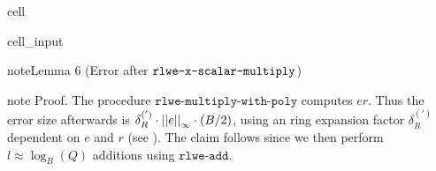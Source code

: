 \documentclass[letterpaper,10pt,english]{jupyterBook}
\begin{document}
\begin{sphinxuseclass}{cell}\begin{sphinxVerbatimInput}

\begin{sphinxuseclass}{cell_input}
\begin{sphinxVerbatim}[commandchars=\\\{\}]
    
       
       
      \PYG{p}{[}      \PYG{p}{]}
       
          \PYG{p}{[}\PYG{p}{]} \PYG{p}{[}\PYG{p}{]} 
            
     
\end{sphinxVerbatim}

\end{sphinxuseclass}\end{sphinxVerbatimInput}

\end{sphinxuseclass}\label{Thesis:error-after-rlwe-x-scalar-multiply}
\begin{sphinxadmonition}{note}{Lemma 6 (Error after \protect\(\texttt{rlwe-x-scalar-multiply}\protect\))}
\end{sphinxadmonition}

\begin{sphinxadmonition}{note}
\sphinxAtStartPar
Proof. The procedure \(\texttt{rlwe-multiply-with-poly}\) computes \(er\).
Thus the error size afterwards is \(\delta_R^{(')} \cdot \left\lvert\left\lvert e \right\rvert\right\rvert_\infty \cdot (B/2)\), using an ring expansion factor \(\delta_R^{(')}\) dependent on \(e\) and \(r\) (see {\hyperref[\detokenize{Thesis:conclusion-on-delta-r}]{}}).
The claim follows since we then perform \(l \approx \log_B(Q)\) additions using \(\texttt{rlwe-add}\).
\end{sphinxadmonition}
\end{document}
